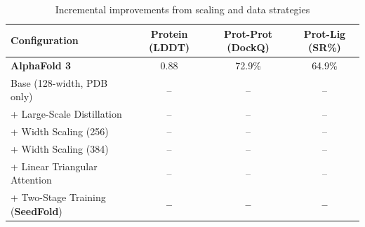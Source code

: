 \setcounter{table}{0}
\begin{table}[t]
    \centering
    \caption{Incremental improvements from scaling and data strategies}
    \begin{tabular}{l ccc}
        \toprule
        \textbf{Configuration} & \textbf{Protein (LDDT)} & \textbf{Prot-Prot (DockQ)} & \textbf{Prot-Lig (SR\%)} \\
        \midrule
        \textbf{AlphaFold 3} & 0.88 & 72.9\% & 64.9\% \\
        \midrule
        Base (128-width, PDB only) & -- & -- & -- \\
        + Large-Scale Distillation & -- & -- & -- \\
        + Width Scaling (256) & -- & -- & -- \\
        + Width Scaling (384) & -- & -- & -- \\
        + Linear Triangular Attention & -- & -- & -- \\
        + Two-Stage Training (\textbf{SeedFold}) & \textbf{--} & \textbf{--} & \textbf{--} \\
        \bottomrule
    \end{tabular}
    \label{tab:incremental_results}
\end{table}

